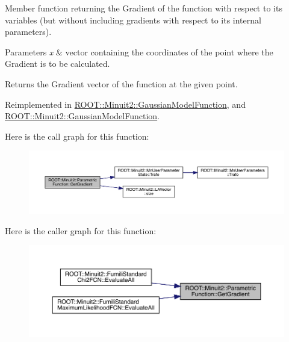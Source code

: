Member function returning the Gradient of the function with respect to its variables (but without including gradients with respect to its internal parameters).


\begin{DoxyParams}{Parameters}
{\em x} & vector containing the coordinates of the point where the Gradient is to be calculated.\\
\hline
\end{DoxyParams}
\begin{DoxyReturn}{Returns}
the Gradient vector of the function at the given point. 
\end{DoxyReturn}


Reimplemented in \mbox{\hyperlink{classROOT_1_1Minuit2_1_1GaussianModelFunction_ac81a3c5531a291b8a9c3af533de07195}{R\+O\+O\+T\+::\+Minuit2\+::\+Gaussian\+Model\+Function}}, and \mbox{\hyperlink{classROOT_1_1Minuit2_1_1GaussianModelFunction_ac81a3c5531a291b8a9c3af533de07195}{R\+O\+O\+T\+::\+Minuit2\+::\+Gaussian\+Model\+Function}}.

Here is the call graph for this function\+:
\nopagebreak
\begin{figure}[H]
\begin{center}
\leavevmode
\includegraphics[width=350pt]{d3/d76/classROOT_1_1Minuit2_1_1ParametricFunction_abe6cfa5c64c578101da1d6fcecfb2249_cgraph}
\end{center}
\end{figure}
Here is the caller graph for this function\+:
\nopagebreak
\begin{figure}[H]
\begin{center}
\leavevmode
\includegraphics[width=350pt]{d3/d76/classROOT_1_1Minuit2_1_1ParametricFunction_abe6cfa5c64c578101da1d6fcecfb2249_icgraph}
\end{center}
\end{figure}
\mbox{\label{classROOT_1_1Minuit2_1_1ParametricFunction_a209b13474fae14c1e4a5523c6850c7ed}} 
